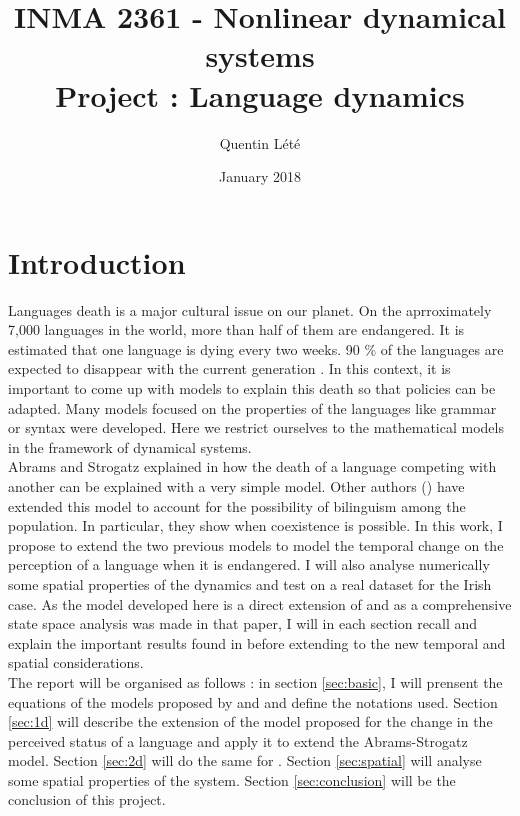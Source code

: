 \documentclass{article}
\title{INMA 2361 - Nonlinear dynamical systems \\
        Project : Language dynamics}
\author{Quentin Lété}
\date{January 2018}
\begin{document}
\maketitle

\section{Introduction}
Languages death is a major cultural issue on our planet.
On the aprroximately 7,000 languages in the world, more than half of them are endangered.
It is estimated that one language is dying every two weeks.
90 \% of the languages are expected to disappear with the current generation \cite{death}.
In this context, it is important to come up with models to explain this death so that policies can be adapted.
Many models focused on the properties of the languages like grammar or syntax were developed.
Here we restrict ourselves to the mathematical models in the framework of dynamical systems. \\
Abrams and Strogatz explained in \cite{death} how the death of a language competing with another can be explained with a very simple model.
Other authors (\cite{bilingual}) have extended this model to account for the possibility of bilinguism among the population. In particular, they show when coexistence is possible.
In this work, I propose to extend the two previous models to model the temporal change on the perception of a language when it is endangered.
I will also analyse numerically some spatial properties of the dynamics and test on a real dataset for the Irish case.
As the model developed here is a direct extension of \cite{bilingual} and as a comprehensive state space analysis was made in that paper,
I will in each section recall and explain the important results found in \cite{bilingual} before extending to the new temporal and spatial considerations. \\
The report will be organised as follows : in section \ref{sec:basic},
I will prensent the equations of the models proposed by \cite{death} and \cite{bilingual} and define the notations used.
Section \ref{sec:1d} will describe the extension of the model proposed for the change in the perceived status of a language and apply it to extend the Abrams-Strogatz model.
Section \ref{sec:2d} will do the same for \cite{bilingual}.
Section \ref{sec:spatial} will analyse some spatial properties of the system.
Section \ref{sec:conclusion} will be the conclusion of this project.
\end{document}

